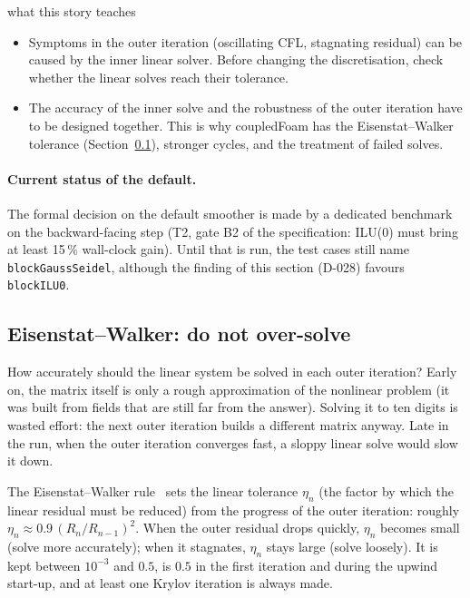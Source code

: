 \documentclass[11pt,a4paper]{article}
\newcommand{\code}[1]{\texttt{#1}}
\begin{document}
\begin{whyitmatters}{what this story teaches}
  \begin{itemize}
  \item Symptoms in the outer iteration (oscillating CFL, stagnating
    residual) can be caused by the inner linear solver. Before changing
    the discretisation, check whether the linear solves reach their
    tolerance.
  \item The accuracy of the inner solve and the robustness of the outer
    iteration have to be designed together. This is why coupledFoam has
    the Eisenstat--Walker tolerance (Section~\ref{sec:ew}), stronger
    cycles, and the treatment of failed solves.
  \end{itemize}
\end{whyitmatters}

\paragraph{Current status of the default.} The formal decision on the
default smoother is made by a dedicated benchmark on the backward-facing
step (T2, gate B2 of the specification: ILU(0) must bring at least 15\,\%
wall-clock gain). Until that is run, the test cases still name
\code{blockGaussSeidel}, although the finding of this section (D-028)
favours \code{blockILU0}.

\subsection{Eisenstat--Walker: do not over-solve}\label{sec:ew}

How accurately should the linear system be solved in each outer iteration?
Early on, the matrix itself is only a rough approximation of the nonlinear
problem (it was built from fields that are still far from the answer).
Solving it to ten digits is wasted effort: the next outer iteration builds
a different matrix anyway. Late in the run, when the outer iteration
converges fast, a sloppy linear solve would slow it down.

The Eisenstat--Walker rule~\cite{EisenstatWalker1996,Knoll2004} sets the
linear tolerance $\eta_n$ (the factor by which the linear residual must be
reduced) from the progress of the outer iteration: roughly $\eta_n\approx
0.9\,(R_n/R_{n-1})^2$. When the outer residual drops quickly, $\eta_n$
becomes small (solve more accurately); when it stagnates, $\eta_n$ stays
large (solve loosely). It is kept between $10^{-3}$ and $0.5$, is $0.5$ in
the first iteration and during the upwind start-up, and at least one
Krylov iteration is always made.
\end{document}
